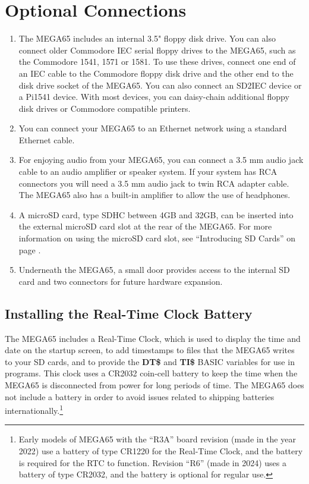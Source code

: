 \section{Optional Connections}
\begin{enumerate}
	\item The MEGA65 includes an internal 3.5" floppy disk drive. You can also connect older Commodore{\textregistered} IEC serial floppy drives to the MEGA65, such as the Commodore 1541, 1571 or 1581. To use these drives, connect one end of an IEC cable to the Commodore floppy disk drive and the other end to the disk drive socket of the MEGA65. You can also connect an SD2IEC device or a Pi1541 device. With most devices, you can daisy-chain additional floppy disk drives or Commodore compatible printers.
	\item You can connect your MEGA65 to an Ethernet network using a standard Ethernet cable.
	\item For enjoying audio from your MEGA65, you can connect a 3.5 mm audio jack cable to an audio amplifier or speaker system. If your system has RCA connectors you will need a 3.5 mm audio jack to twin RCA adapter cable. The MEGA65 also has a built-in amplifier to allow the use of headphones.
	\item A microSD card, type SDHC between 4GB and 32GB, can be inserted into the external microSD card slot at the rear of the MEGA65. For more information on using the microSD card slot, see ``Introducing SD Cards'' on page \pageref{sec:introducing-sd-cards}.
	\item Underneath the MEGA65, a small door provides access to the internal SD card and two connectors for future hardware expansion.
\end{enumerate}

\subsection{Installing the Real-Time Clock Battery}

The MEGA65 includes a Real-Time Clock, which is used to display the time and date on the startup screen, to add timestamps to files that the MEGA65 writes to your SD cards, and to provide the {\bf DT\$} and {\bf TI\$} BASIC variables for use in programs. This clock uses a CR2032 coin-cell battery to keep the time when the MEGA65 is disconnected from power for long periods of time. The MEGA65 does not include a battery in order to avoid issues related to shipping batteries internationally.\footnote{Early models of MEGA65 with the ``R3A'' board revision (made in the year 2022) use a battery of type CR1220 for the Real-Time Clock, and the battery is required for the RTC to function. Revision ``R6'' (made in 2024) uses a battery of type CR2032, and the battery is optional for regular use.}

